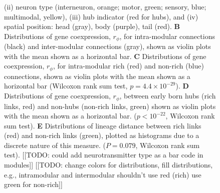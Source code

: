 \documentclass[10pt,letterpaper]{article}
\begin{document}
\begin{figure}[!h]
{(ii) neuron type (interneuron, orange; motor, green; sensory, blue; multimodal, yellow),
(iii) hub indicator (red for hubs), and
(iv) spatial position: head (gray), body (purple), tail (red).
\textbf{B} Distributions of gene coexpression, $r_\phi$, for intra-modular connections (black) and inter-modular connections (gray), shown as violin plots with the mean shown as a horizontal bar.
\textbf{C} Distributions of gene coexpression, $r_\phi$, for intra-modular rich (red) and non-rich (blue) connections, shown as violin plots with the mean shown as a horizontal bar (Wilcoxon rank sum test, $p = 4.4\times 10^{-29}$).
\textbf{D} Distributions of gene coexpression, $r_\phi$, between early born hubs (rich links, red) and non-hubs (non-rich links, green) shown as violin plots with the mean shown as a horizontal bar. ($p < 10^{-22}$, Wilcoxon rank sum test).
\textbf{E} Distributions of lineage distance between rich links (red) and non-rich links (green), plotted as histograms due to a discrete nature of this measure. ($P = 0.079$, Wilcoxon rank sum test).
[[TODO: could add neurotransmitter type as a bar code in modules]]
[[TODO: change colors for distributions, fill distributions, e.g., intramodular and intermodular shouldn't use red (rich) use green for non-rich]]
}
 \label{fig:OtherInfluences}
\end{figure}
\end{document}
